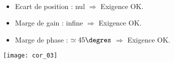 \ifprof
\begin{corrige}~\\
\begin{itemize}
\item Ecart de position : nul $\Rightarrow$ Exigence OK.
\item Marge de gain : infine $\Rightarrow$ Exigence OK.
\item Marge de phase : $\simeq 45\degres$ $\Rightarrow$ Exigence OK.
\end{itemize}

\begin{center}
\texttt{[image: cor\_03]}
\end{center}
 
\end{corrige}
\else
\fi







%
%
%
%
%
%
%
%
%
%
%
